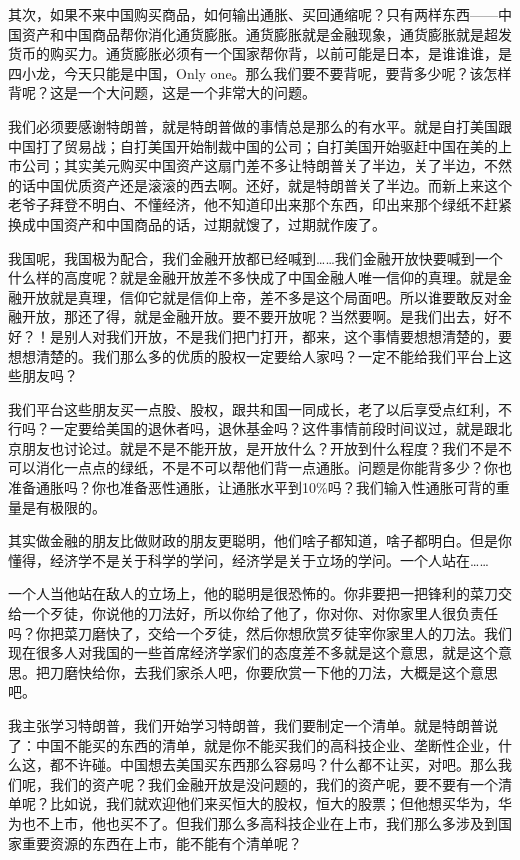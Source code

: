 \documentclass[UTF8, 12pt, a4paper]{ctexrep}
\begin{document}
其次，如果不来中国购买商品，如何输出通胀、买回通缩呢？只有两样东西——中国资产和中国商品帮你消化通货膨胀。通货膨胀就是金融现象，通货膨胀就是超发货币的购买力。通货膨胀必须有一个国家帮你背，以前可能是日本，是谁谁谁，是四小龙，今天只能是中国，Only one。那么我们要不要背呢，要背多少呢？该怎样背呢？这是一个大问题，这是一个非常大的问题。

我们必须要感谢特朗普，就是特朗普做的事情总是那么的有水平。就是自打美国跟中国打了贸易战；自打美国开始制裁中国的公司；自打美国开始驱赶中国在美的上市公司；其实美元购买中国资产这扇门差不多让特朗普关了半边，关了半边，不然的话中国优质资产还是滚滚的西去啊。还好，就是特朗普关了半边。而新上来这个老爷子拜登不明白、不懂经济，他不知道印出来那个东西，印出来那个绿纸不赶紧换成中国资产和中国商品的话，过期就馊了，过期就作废了。

我国呢，我国极为配合，我们金融开放都已经喊到……我们金融开放快要喊到一个什么样的高度呢？就是金融开放差不多快成了中国金融人唯一信仰的真理。就是金融开放就是真理，信仰它就是信仰上帝，差不多是这个局面吧。所以谁要敢反对金融开放，那还了得，就是金融开放。要不要开放呢？当然要啊。是我们出去，好不好？！是别人对我们开放，不是我们把门打开，都来，这个事情要想想清楚的，要想想清楚的。我们那么多的优质的股权一定要给人家吗？一定不能给我们平台上这些朋友吗？

我们平台这些朋友买一点股、股权，跟共和国一同成长，老了以后享受点红利，不行吗？一定要给美国的退休者吗，退休基金吗？这件事情前段时间议过，就是跟北京朋友也讨论过。就是不是不能开放，是开放什么？开放到什么程度？我们不是不可以消化一点点的绿纸，不是不可以帮他们背一点通胀。问题是你能背多少？你也准备通胀吗？你也准备恶性通胀，让通胀水平到10\%吗？我们输入性通胀可背的重量是有极限的。

其实做金融的朋友比做财政的朋友更聪明，他们啥子都知道，啥子都明白。但是你懂得，经济学不是关于科学的学问，经济学是关于立场的学问。一个人站在……

一个人当他站在敌人的立场上，他的聪明是很恐怖的。你非要把一把锋利的菜刀交给一个歹徒，你说他的刀法好，所以你给了他了，你对你、对你家里人很负责任吗？你把菜刀磨快了，交给一个歹徒，然后你想欣赏歹徒宰你家里人的刀法。我们现在很多人对我国的一些首席经济学家们的态度差不多就是这个意思，就是这个意思。把刀磨快给你，去我们家杀人吧，你要欣赏一下他的刀法，大概是这个意思吧。

我主张学习特朗普，我们开始学习特朗普，我们要制定一个清单。就是特朗普说了：中国不能买的东西的清单，就是你不能买我们的高科技企业、垄断性企业，什么这，都不许碰。中国想去美国买东西那么容易吗？什么都不让买，对吧。那么我们呢，我们的资产呢？我们金融开放是没问题的，我们的资产呢，要不要有一个清单呢？比如说，我们就欢迎他们来买恒大的股权，恒大的股票；但他想买华为，华为也不上市，他也买不了。但我们那么多高科技企业在上市，我们那么多涉及到国家重要资源的东西在上市，能不能有个清单呢？
\end{document}
